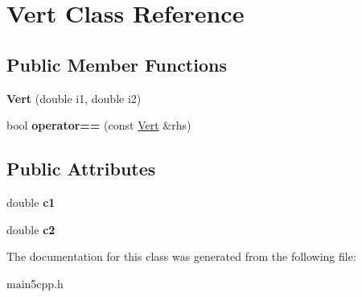 \hypertarget{class_vert}{}\section{Vert Class Reference}
\label{class_vert}
\subsection*{Public Member Functions}
\begin{DoxyCompactItemize}
\item 
\mbox{\label{class_vert_adafd82053d5532a81753ffca27465d98}} 
{\bfseries Vert} (double i1, double i2)
\item 
\mbox{\label{class_vert_ab1144e4319c8a143468d11bb3dd45347}} 
bool {\bfseries operator==} (const \mbox{\hyperlink{class_vert}{Vert}} \&rhs)
\end{DoxyCompactItemize}
\subsection*{Public Attributes}
\begin{DoxyCompactItemize}
\item 
\mbox{\label{class_vert_a4a7108e232ab803e8977b37ac4efaf99}} 
double {\bfseries c1}
\item 
\mbox{\label{class_vert_a9bc58ca1af5fc074fcc303c2432d64b0}} 
double {\bfseries c2}
\end{DoxyCompactItemize}


The documentation for this class was generated from the following file\+:\begin{DoxyCompactItemize}
\item 
main5cpp.\+h\end{DoxyCompactItemize}
